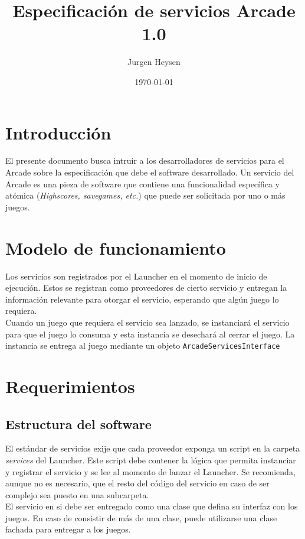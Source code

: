 \documentclass[language=spanish]{article}
\begin{document}
\title{Especificación de servicios Arcade 1.0}
\author{Jurgen Heysen}
\date{\today}
\maketitle
\newpage

\tableofcontents
\newpage

\section{Introducción}

El presente documento busca intruir a los desarrolladores de servicios para el Arcade sobre la especificación que debe el software desarrollado.
Un servicio del Arcade es una pieza de software que contiene una funcionalidad específica y atómica ({\em Highscores, savegames, etc.}) que puede ser solicitada por uno o más juegos.

\section{Modelo de funcionamiento}

Los servicios son registrados por el Launcher en el momento de inicio de ejecución. Estos se registran como proveedores de cierto servicio y entregan la información relevante para otorgar el servicio, esperando que algún juego lo requiera.\\
Cuando un juego que requiera el servicio sea lanzado, se instanciará el servicio para que el juego lo consuma y esta instancia se desechará al cerrar el juego. La instancia se entrega al juego mediante un objeto {\tt ArcadeServicesInterface}

\section{Requerimientos}

\subsection{Estructura del software}

El estándar de servicios exije que cada proveedor exponga un script en la carpeta {\em services} del Launcher. Este script debe contener la lógica que permita instanciar y registrar el servicio y se lee al momento de lanzar el Launcher. Se recomienda, aunque no es necesario, que el resto del código del servicio en caso de ser complejo sea puesto en una subcarpeta.\\
El servicio en si debe ser entregado como una clase que defina su interfaz con los juegos. En caso de consistir de más de una clase, puede utilizarse una clase fachada para entregar a los juegos.
\end{document}
